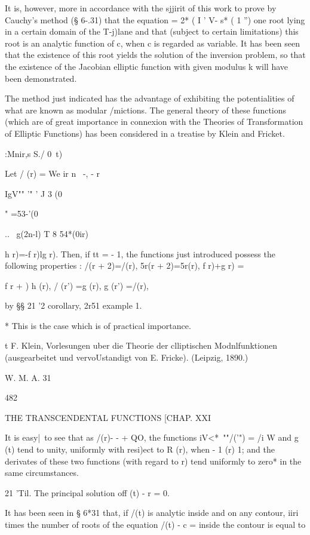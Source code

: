 It is, however, more in accordance with the sjjirit of this work to
prove by Cauchy's method (§ 6-.31) that the equation = 2* ( I ' V- s*
( 1 '') one root lying in a certain domain of the T-j)lane and that
(subject to certain limitations) this root is an analytic function of
c, when c is regarded as variable. It has been seen that the existence
of this root yields the solution of the inversion problem, so that the
existence of the Jacobian elliptic function with given modulus k will
have been demonstrated.

The method just indicated has the advantage of exhibiting the
potentialities of what are known as modular /mictions. The general
theory of these functions (which are of great importance in connexion
with the Theories of Transformation of Elliptic Functions) has been
considered in a treatise by Klein and Fricket.

:Mnir,s S./ 0\ t)

Let / (r) = We ir n \ -, - r \

IgV"" '" ' J 3 (0

" =53-'(0

.. \ g(2n-l) T 8 54*(0ir)

h r)=-f r)lg r). Then, if tt = - 1, the functions just introduced
possess the following properties : /(r + 2)=/(r), 5r(r + 2)=5r(r), f
r)+g r) = \,

f r + ) h (r), / (r') =g (r), g (r') =/(r),

by §§ 21 '2 corollary, 2r51 example 1.

* This is the case which is of practical importance.

t F. Klein, Vorlesungen uber die Theorie der clliptischen
Modnlfunktionen (ausgearbeitet und vervoUstandigt von E. Fricke).
(Leipzig, 1890.)

W. M. A. 31

482

THE TRANSCENDENTAL FUNCTIONS [CHAP. XXI

It is easy|\ to see that as /(r)- - + QO, the functions iV<*~""/('")
= /i W and g (t) tend to unity, uniformly with resi)ect to R (r), when
- 1 (r) 1; and the derivates of these two functions (with regard to
r) tend uniformly to zero* in the same circumstances.

21 'Til. The principal solution off (t) - r = 0.

It has been seen in § 6*31 that, if /(t) is analytic inside and on any
contour, iiri times the number of roots of the equation /(t) - c =
inside the contour is equal to

